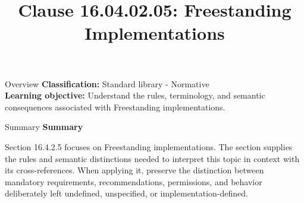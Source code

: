 \documentclass[10pt,letterpaper]{article}
\title{Clause 16.04.02.05: Freestanding Implementations}
\author{}
\date{}
\begin{document}
\maketitle
\begin{CornellOverviewBox}{Overview}
\textbf{Classification:} Standard library - Normative\\[2pt]
\textbf{Learning objective:} Understand the rules, terminology, and semantic consequences associated with Freestanding implementations.
\end{CornellOverviewBox}\begin{CornellSummaryBox}{Summary}
{\sffamily\bfseries\color{Accent} Summary}\par\vspace{3pt}Section 16.4.2.5 focuses on Freestanding implementations. The section supplies the rules and semantic distinctions needed to interpret this topic in context with its cross-references. When applying it, preserve the distinction between mandatory requirements, recommendations, permissions, and behavior deliberately left undefined, unspecified, or implementation-defined.
\end{CornellSummaryBox}
\end{document}
